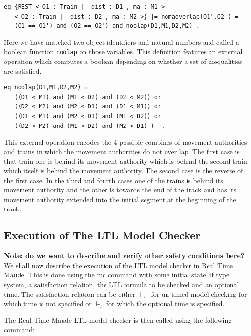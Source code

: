 \begin{lstlisting}
eq {REST < O1 : Train |  dist : D1 , ma : M1 > 
   < O2 : Train |  dist : D2 , ma : M2 >} |= nomaoverlap(O1',O2') = 
   (O1 == O1') and (O2 == O2') and noolap(D1,M1,D2,M2) .
\end{lstlisting}
Here we have matched two object identifiers and natural numbers and called a boolean function \texttt{noolap} on those variables. This definition features an external operation which computes a boolean depending on whether a set of inequalities are satisfied. 

\begin{lstlisting}[caption = The no overlap operation]
eq noolap(D1,M1,D2,M2) = 
   ((D1 < M1) and (M1 < D2) and (D2 < M2)) or 
   ((D2 < M2) and (M2 < D1) and (D1 < M1)) or 
   ((D1 < M1) and (M2 < D1) and (M1 < D2)) or 
   ((D2 < M2) and (M1 < D2) and (M2 < D1) )  .  
\end{lstlisting}

This external operation encodes the 4 possible combines of movement authorities and trains in which the movement authorities do not over lap.  The first case is that train one is behind its movement authority which is behind the second train which itself is behind the movement authority. The second case is the reverse of the first case. In the third and fourth cases  one of the trains is behind its movement authority and the other is towards the end of the track and has its movement authority extended into the initial segment at the beginning of the track.

\subsection{Execution of The LTL Model Checker}
\textbf{Note: do we want to describe and verify other safety conditions here?}
We shall now describe the execution of the LTL model checker in Real Time Maude. This is done using the mc command with some initial state of type system, a satisfaction relation, the LTL formula to be checked and an optional time. The satisfaction relation can be either $\models_u$ for un-timed model checking for which time is not specified or $\models_t$ for which the optional time is specified.

The Real Time Maude LTL model checker is then called using the following command:


